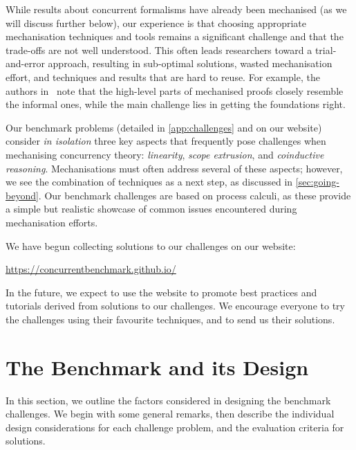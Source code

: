 \documentclass[runningheads]{llncs}
\begin{document}
While results about concurrent
formalisms have already been mechanised (as we will discuss further
below), our experience is that choosing appropriate mechanisation
techniques and tools remains a significant challenge and that the
trade-offs are not well understood.  This often leads researchers
toward a trial-and-error approach, resulting in sub-optimal solutions,
wasted mechanisation effort, and techniques and results that are hard
to reuse. For example, the authors in~\cite{Cruz-Filipe2021b} note that the high-level parts of
mechanised proofs closely resemble the informal ones, while the
main challenge lies in getting the foundations right.

Our benchmark problems (detailed in \cref{app:challenges} and on our website) consider
\emph{in isolation} three key aspects that frequently pose challenges
when mechanising concurrency theory: \emph{linearity}, \emph{scope
  extrusion}, and \emph{coinductive reasoning}.  Mechanisations must
often address several of these aspects; however, we
see the combination of techniques as a next
step, as discussed in \cref{sec:going-beyond}.
Our benchmark challenges are based on process calculi, as these provide a simple but
realistic showcase of common issues encountered during mechanisation
efforts.

We have begun collecting solutions to our challenges on our website:
%
\begin{center}
  \url{https://concurrentbenchmark.github.io/}
\end{center}
%
In the future, we expect to use the website to promote best practices and tutorials derived from solutions to our challenges.
We encourage everyone to try the challenges using their favourite techniques, and to send us their solutions.

\section{The Benchmark and its Design}\label{sec:design-discussion}
In this section, we outline the factors considered in designing the benchmark challenges.
We begin with some general remarks, then describe the individual design considerations for each challenge problem, and the evaluation criteria for solutions.
\end{document}
